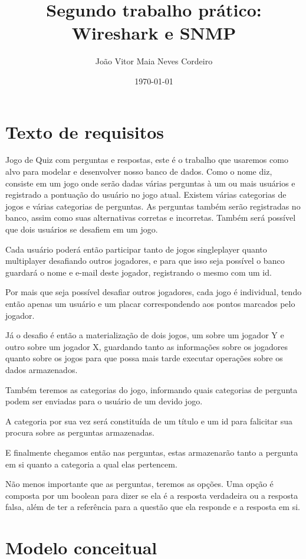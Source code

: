 \documentclass[12pt]{article}
\author{João Vitor Maia Neves Cordeiro}
\title{Segundo trabalho prático: Wireshark e SNMP}
\date{\today}
\begin{document}
\maketitle

\section{Texto de requisitos}

Jogo de Quiz com perguntas e respostas, este é o trabalho que usaremos como alvo para modelar e desenvolver nosso banco de dados. Como o nome diz, consiste em um jogo onde serão dadas várias perguntas à um ou mais usuários e registrado a pontuação do usuário no jogo atual. Existem várias categorias de jogos e várias categorias de perguntas. As perguntas também serão registradas no banco, assim como suas alternativas corretas e incorretas. Também será possível que dois usuários se desafiem em um jogo.

Cada usuário poderá então participar tanto de jogos singleplayer quanto multiplayer desafiando outros jogadores, e para que isso seja possível o banco guardará o nome e e-mail deste jogador, registrando o mesmo com um id.

Por mais que seja possível desafiar outros jogadores, cada jogo é individual, tendo então apenas um usuário e um placar correspondendo aos pontos marcados pelo jogador.

Já o desafio é então a materialização de dois jogos, um sobre um jogador Y e outro sobre um jogador X, guardando tanto as informações sobre os jogadores quanto sobre os jogos para que possa mais tarde executar operações sobre os dados armazenados.

Também teremos as categorias do jogo, informando quais categorias de pergunta podem ser enviadas para o usuário de um devido jogo.

A categoria por sua vez será constituída de um título e um id para falicitar sua procura sobre as perguntas armazenadas.

E finalmente chegamos então nas perguntas, estas armazenarão tanto a pergunta em si quanto a categoria a qual elas pertencem.

Não menos importante que as perguntas, teremos as opções. Uma opção é composta por um boolean para dizer se ela é a resposta verdadeira ou a resposta falsa, além de ter a referência para a questão que ela responde e a resposta em si.

\section{Modelo conceitual}
\end{document}
